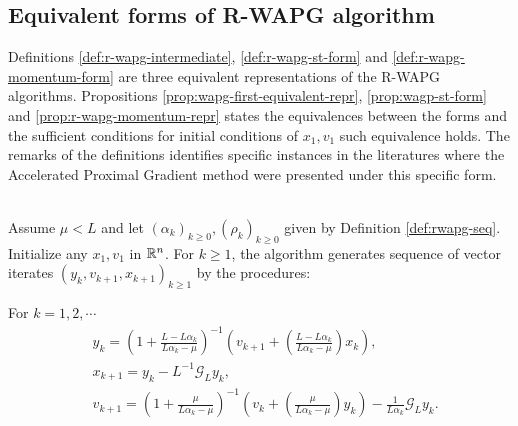 \documentclass[12pt]{article}
\begin{document}
    \subsection{Equivalent forms of R-WAPG algorithm}\label{ssec:quiv-repr-rwapg}
        Definitions \ref{def:r-wapg-intermediate}, \ref{def:r-wapg-st-form} and \ref{def:r-wapg-momentum-form} are three equivalent representations of the R-WAPG algorithms. 
        Propositions \ref{prop:wapg-first-equivalent-repr}, \ref{prop:wagp-st-form} and \ref{prop:r-wapg-momentum-repr} states the equivalences between the forms and the sufficient conditions for initial conditions of $x_1, v_1$ such equivalence holds. 
        The remarks of the definitions identifies specific instances in the literatures where the Accelerated Proximal Gradient method were presented under this specific form. 
        \begin{definition}\label{def:r-wapg-intermediate}\;\\
            Assume $\mu < L$ and let $(\alpha_k)_{k \ge 0}, (\rho_k)_{k \ge 0}$ given by Definition \ref{def:rwapg-seq}. 
            Initialize any $x_1, v_1$ in $\mathbb R^n$. 
            For $k \ge 1$, the algorithm generates sequence of vector iterates $(y_{k}, v_{k + 1}, x_{k + 1})_{k \ge 1}$ by the procedures: 
            \begin{tcolorbox}
                For $k = 1, 2, \cdots$
                \begin{align*} 
                    & y_{k} = 
                    \left(
                        1 + \frac{L - L\alpha_{k}}{L\alpha_{k} - \mu}
                    \right)^{-1}
                    \left(
                        v_{k + 1} + 
                        \left(\frac{L - L\alpha_{k}}{L\alpha_{k} - \mu} \right) x_{k}
                    \right), 
                    \\
                    & x_{k + 1} = 
                    y_k - L^{-1} \mathcal G_L y_k, 
                    \\
                    & v_{k + 1} = 
                    \left(
                        1 + \frac{\mu}{L \alpha_k - \mu}
                    \right)^{-1}
                    \left(
                        v_k + 
                        \left(\frac{\mu}{L \alpha_k - \mu}\right) y_k
                    \right) - \frac{1}{L\alpha_{k}}\mathcal G_L y_k. 
                \end{align*}
            \end{tcolorbox}
        \end{definition}
\end{document}
